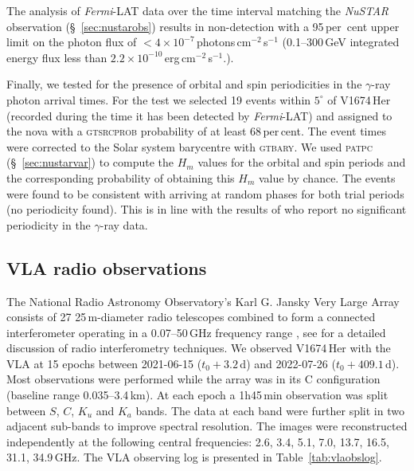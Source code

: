 \documentclass[a4paper,fleqn,usenatbib]{mnras}
\newcommand{\nova}{V1674\,Her}
\newcommand{\fermilat}{\emph{Fermi}-LAT}
\begin{document}
The analysis of \fermilat{} data over the time interval matching the {\em NuSTAR} observation (\S~\ref{sec:nustarobs}) 
results in non-detection with a 95\,per~cent upper limit on the photon flux of $< 4 \times 10^{-7}$\,photons\,cm$^{-2}$\,s$^{-1}$
(0.1--300\,GeV integrated energy flux less than $2.2 \times 10^{-10}$\,erg\,cm$^{-2}$\,s$^{-1}$.).


Finally, we tested for the presence of orbital and spin periodicities \citep{2022ApJ...940L..56P} 
in the $\gamma$-ray photon arrival times. For the test we selected 19 events within $5^\circ$ of \nova{} 
(recorded during the time it has been detected by \fermilat{}) and 
assigned to the nova with a \textsc{gtsrcprob} probability of at least 68\,per\,cent. 
The event times were corrected to the Solar system barycentre with \textsc{gtbary}. 
We used \textsc{patpc} (\S~\ref{sec:nustarvar}) to compute the $H_m$ values 
for the orbital and spin periods and the corresponding probability of obtaining this $H_m$ value by chance. 
The events were found to be consistent with arriving at random phases for both trial periods (no periodicity found). 
This is in line with the results of \cite{2022MNRAS.517L..97L} who report no significant periodicity in the $\gamma$-ray data.



\subsection{VLA radio observations}
\label{sec:vla}

The National Radio Astronomy Observatory's Karl G. Jansky Very Large Array 
consists of 27 25\,m-diameter radio telescopes combined to form a connected interferometer
operating in a 0.07--50\,GHz frequency range \citep{1980ApJS...44..151T,2011ApJ...739L...1P}, 
see \cite{2017isra.book.....T} for a detailed discussion of radio interferometry techniques.
We observed \nova{} with the VLA 
at 15 epochs between 2021-06-15 ($t_0+3.2$\,d) and 2022-07-26 ($t_0+409.1$\,d). 
Most observations were performed while the array was in its C configuration (baseline range 0.035--3.4\,km). 
At each epoch a 1h45\,min observation was split between $S$, $C$, $K_u$ and $K_a$ bands. 
The data at each band were further split in two adjacent sub-bands to improve spectral resolution. 
The images were reconstructed independently at the following central 
frequencies: 2.6, 3.4, 5.1, 7.0, 13.7, 16.5, 31.1, 34.9\,GHz.
The VLA observing log is presented in Table~\ref{tab:vlaobslog}.
\end{document}
